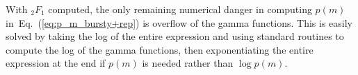 \documentclass[12pt]{article}%
\newcommand{\eq}[1]{Eq.~(\ref{#1})}
\begin{document}
With ${_2F_1}$ computed, the only remaining numerical danger in computing
$p(m)$ in~\eq{eq:p_m_bursty+rep} is overflow of the gamma functions.
This is easily solved by taking the log of the entire expression
and using standard routines to compute the log of the gamma functions,
then exponentiating the entire expression at the end if $p(m)$
is needed rather than $\log p(m)$.

\appendix


% 


\end{document}
